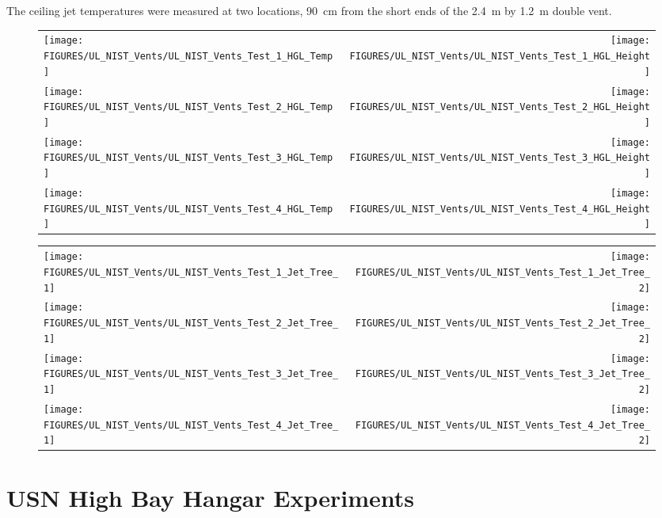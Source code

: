 The ceiling jet temperatures were measured at two locations, 90~cm from the short ends of the 2.4~m by 1.2~m double vent.

\begin{figure}[p]
\begin{tabular*}{\textwidth}{l@{\extracolsep{\fill}}r}
\texttt{[image: FIGURES/UL\_NIST\_Vents/UL\_NIST\_Vents\_Test\_1\_HGL\_Temp]} &
\texttt{[image: FIGURES/UL\_NIST\_Vents/UL\_NIST\_Vents\_Test\_1\_HGL\_Height]} \\
\texttt{[image: FIGURES/UL\_NIST\_Vents/UL\_NIST\_Vents\_Test\_2\_HGL\_Temp]} &
\texttt{[image: FIGURES/UL\_NIST\_Vents/UL\_NIST\_Vents\_Test\_2\_HGL\_Height]} \\
\texttt{[image: FIGURES/UL\_NIST\_Vents/UL\_NIST\_Vents\_Test\_3\_HGL\_Temp]} &
\texttt{[image: FIGURES/UL\_NIST\_Vents/UL\_NIST\_Vents\_Test\_3\_HGL\_Height]} \\
\texttt{[image: FIGURES/UL\_NIST\_Vents/UL\_NIST\_Vents\_Test\_4\_HGL\_Temp]} &
\texttt{[image: FIGURES/UL\_NIST\_Vents/UL\_NIST\_Vents\_Test\_4\_HGL\_Height]}
\end{tabular*}
\end{figure}

\begin{figure}[p]
\begin{tabular*}{\textwidth}{l@{\extracolsep{\fill}}r}
\texttt{[image: FIGURES/UL\_NIST\_Vents/UL\_NIST\_Vents\_Test\_1\_Jet\_Tree\_1]} &
\texttt{[image: FIGURES/UL\_NIST\_Vents/UL\_NIST\_Vents\_Test\_1\_Jet\_Tree\_2]} \\
\texttt{[image: FIGURES/UL\_NIST\_Vents/UL\_NIST\_Vents\_Test\_2\_Jet\_Tree\_1]} &
\texttt{[image: FIGURES/UL\_NIST\_Vents/UL\_NIST\_Vents\_Test\_2\_Jet\_Tree\_2]} \\
\texttt{[image: FIGURES/UL\_NIST\_Vents/UL\_NIST\_Vents\_Test\_3\_Jet\_Tree\_1]} &
\texttt{[image: FIGURES/UL\_NIST\_Vents/UL\_NIST\_Vents\_Test\_3\_Jet\_Tree\_2]} \\
\texttt{[image: FIGURES/UL\_NIST\_Vents/UL\_NIST\_Vents\_Test\_4\_Jet\_Tree\_1]} &
\texttt{[image: FIGURES/UL\_NIST\_Vents/UL\_NIST\_Vents\_Test\_4\_Jet\_Tree\_2]}
\end{tabular*}
\label{UL_NIST_Ceiling_Jet}
\end{figure}



\clearpage

\section{USN High Bay Hangar Experiments}

